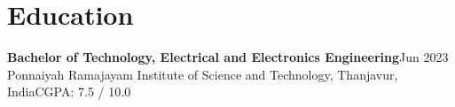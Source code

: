 \documentclass[10pt,a4paper]{article}
\begin{document}
\section*{Education}
\textbf{Bachelor of Technology, Electrical and Electronics Engineering}\hfill Jun 2023\\
Ponnaiyah Ramajayam Institute of Science and Technology, Thanjavur, India\hfill CGPA: 7.5 / 10.0

\end{document}
